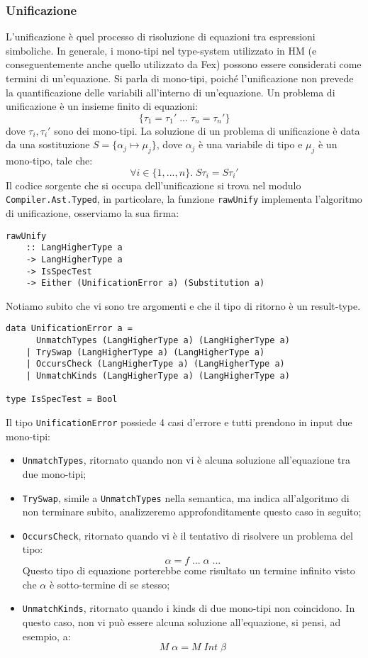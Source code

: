 \documentclass[10pt,a4paper]{article}
\begin{document}
\hypertarget{Unificazione}{\subsubsection{Unificazione}}
L'unificazione è quel processo di risoluzione di equazioni tra espressioni simboliche. In generale, i mono-tipi nel
type-system utilizzato in HM (e conseguentemente anche quello utilizzato da Fex) possono essere considerati come
termini di un'equazione. Si parla di mono-tipi, poiché l'unificazione non prevede la quantificazione delle variabili
all'interno di un'equazione. Un problema di unificazione è un insieme finito di equazioni:
\[ \{ \tau_1 = \tau_1' \; ... \; \tau_n = \tau_n' \} \]
dove $ \tau_i, \tau_i' $ sono dei mono-tipi. La soluzione di un problema di unificazione è data da una sostituzione
$ S = \{ \alpha_j \mapsto \mu_j \} $, dove $ \alpha_j $ è una variabile di tipo e $ \mu_j $ è un mono-tipo, tale che:
\[ \forall i \in \{1, ..., n\}. \; S\tau_i = S\tau_i' \]
Il codice sorgente che si occupa dell'unificazione si trova nel modulo \texttt{Compiler.Ast.Typed}, in particolare,
la funzione \texttt{rawUnify} implementa l'algoritmo di unificazione, osserviamo la sua firma:
\begin{lstlisting}
rawUnify
    :: LangHigherType a
    -> LangHigherType a
    -> IsSpecTest
    -> Either (UnificationError a) (Substitution a)
\end{lstlisting}
Notiamo subito che vi sono tre argomenti e che il tipo di ritorno è un result-type.
\begin{lstlisting}
data UnificationError a =
      UnmatchTypes (LangHigherType a) (LangHigherType a)
    | TrySwap (LangHigherType a) (LangHigherType a)
    | OccursCheck (LangHigherType a) (LangHigherType a)
    | UnmatchKinds (LangHigherType a) (LangHigherType a)

type IsSpecTest = Bool
\end{lstlisting}
Il tipo \texttt{UnificationError} possiede 4 casi d'errore e tutti prendono in input due mono-tipi:
\begin{itemize}
    \item \texttt{UnmatchTypes}, ritornato quando non vi è alcuna soluzione all'equazione tra due mono-tipi;
    \item \texttt{TrySwap}, simile a \texttt{UnmatchTypes} nella semantica, ma indica all'algoritmo di non terminare
    subito, analizzeremo approfonditamente questo caso in seguito;
    \item \texttt{OccursCheck}, ritornato quando vi è il tentativo di risolvere un problema del tipo:
        \[ \alpha = f \; ... \; \alpha \; ...  \]
    Questo tipo di equazione porterebbe come risultato un termine infinito visto che $ \alpha $ è sotto-termine di
    se stesso;
    \item \texttt{UnmatchKinds}, ritornato quando i kinds di due mono-tipi non coincidono. In questo caso, non vi
    può essere alcuna soluzione all'equazione, si pensi, ad esempio, a:
        \[ M \; \alpha = M \; Int \; \beta \]
\end{itemize}
\end{document}
